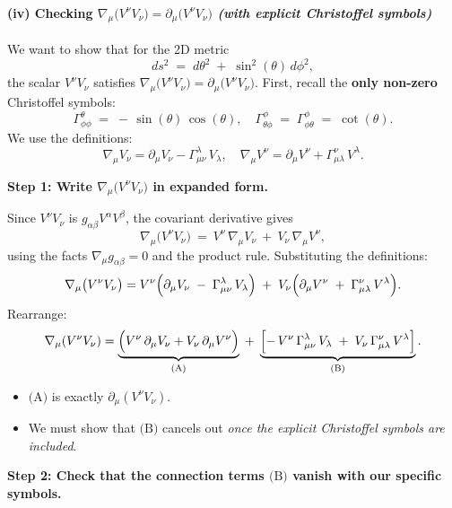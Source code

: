 \documentclass{article}
\begin{document}
\paragraph*{(iv) Checking \(\nabla_{\mu}\bigl(V^{\nu} V_{\nu}\bigr)=\partial_{\mu}\bigl(V^{\nu} V_{\nu}\bigr)\) \emph{(with explicit Christoffel symbols)}}

We want to show that for the 2D metric
\[
ds^2 \;=\; d\theta^2 \;+\; \sin^2(\theta)\,d\phi^2,
\]
the scalar \(V^\nu V_\nu\) satisfies
\(\nabla_{\mu}\bigl(V^{\nu} V_{\nu}\bigr)=\partial_{\mu}\bigl(V^{\nu} V_{\nu}\bigr)\).
First, recall the \textbf{only non-zero} Christoffel symbols:
\[
\Gamma^\theta_{\phi\phi} \;=\; -\,\sin(\theta)\,\cos(\theta),
\quad
\Gamma^\phi_{\theta\phi} \;=\; \Gamma^\phi_{\phi\theta} \;=\; \cot(\theta).
\]
We use the definitions:
\[
\nabla_\mu V_\nu
=
\partial_\mu V_\nu
-
\Gamma^\lambda_{\mu\nu}\,V_\lambda,
\quad
\nabla_\mu V^\nu
=
\partial_\mu V^\nu
+
\Gamma^\nu_{\mu\lambda}\,V^\lambda.
\]

\medskip

\noindent
\textbf{Step 1: Write \(\nabla_\mu\bigl(V^\nu V_\nu\bigr)\) in expanded form.}

Since \(V^\nu V_\nu\) is \(g_{\alpha\beta}V^\alpha V^\beta\), the covariant derivative gives
\[
\nabla_\mu \bigl(V^\nu V_\nu\bigr)
~=~
V^\nu\,\nabla_\mu V_\nu
~+~
V_\nu\,\nabla_\mu V^\nu,
\]
using the facts \(\nabla_\mu g_{\alpha\beta} = 0\) and the product rule. Substituting the definitions:
\[
\nabla_\mu \bigl(V^\nu V_\nu\bigr)
=
V^\nu
\Bigl(
   \partial_\mu V_\nu
   \;-\;
   \Gamma^\lambda_{\mu\nu}\,V_\lambda
\Bigr)
\;+\;
V_\nu
\Bigl(
   \partial_\mu V^\nu
   \;+\;
   \Gamma^\nu_{\mu\lambda}\,V^\lambda
\Bigr).
\]
Rearrange:
\[
\nabla_\mu (V^\nu V_\nu)
=
\underbrace{
   \Bigl(V^\nu\,\partial_\mu V_\nu + V_\nu\,\partial_\mu V^\nu\Bigr)
}_{\text{(A)}}
\;+\;
\underbrace{
   \Bigl[-\,V^\nu\,\Gamma^\lambda_{\mu\nu}\,V_\lambda \;+\; V_\nu\,\Gamma^\nu_{\mu\lambda}\,V^\lambda\Bigr]
}_{\text{(B)}}.
\]

\begin{itemize}
\item \(\text{(A)}\) is exactly \(\partial_\mu(V^\nu V_\nu)\).
\item We must show that \(\text{(B)}\) cancels out \emph{once the explicit Christoffel symbols are included}.
\end{itemize}

\medskip

\noindent
\textbf{Step 2: Check that the connection terms \(\text{(B)}\) vanish with our specific symbols.}
\end{document}
